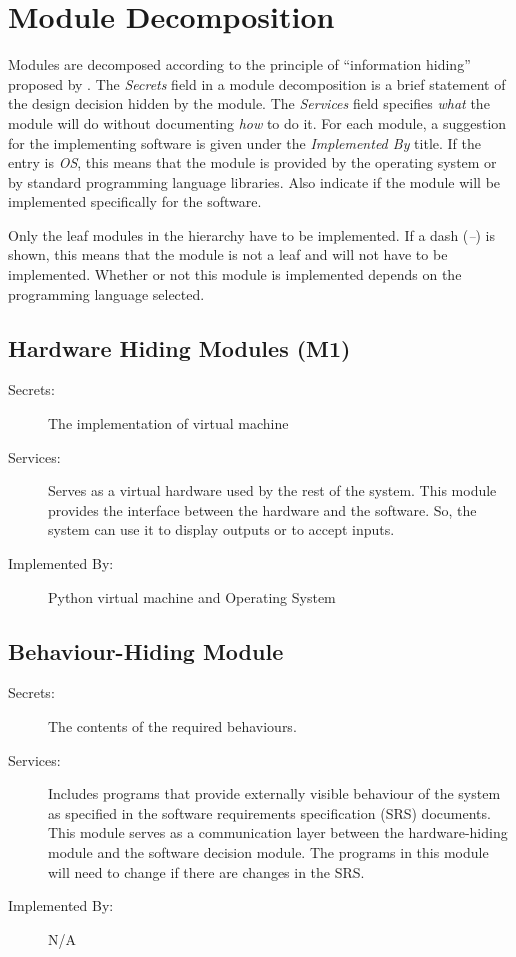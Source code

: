 \documentclass[12pt, titlepage]{article}
\begin{document}
\section{Module Decomposition} \label{SecMD}

Modules are decomposed according to the principle of ``information hiding''
proposed by \citet{ParnasEtAl1984}. The \emph{Secrets} field in a module
decomposition is a brief statement of the design decision hidden by the
module. The \emph{Services} field specifies \emph{what} the module will do
without documenting \emph{how} to do it. For each module, a suggestion for the
implementing software is given under the \emph{Implemented By} title. If the
entry is \emph{OS}, this means that the module is provided by the operating
system or by standard programming language libraries.  Also indicate if the
module will be implemented specifically for the software.

Only the leaf modules in the
hierarchy have to be implemented. If a dash (\emph{--}) is shown, this means
that the module is not a leaf and will not have to be implemented. Whether or
not this module is implemented depends on the programming language
selected.

\subsection{Hardware Hiding Modules (M1)}

\begin{description}
\item[Secrets:]The implementation of virtual machine
\item[Services:]Serves as a virtual hardware used by the rest of the
  system. This module provides the interface between the hardware and the
  software. So, the system can use it to display outputs or to accept inputs.
\item[Implemented By:] Python virtual machine and Operating System
\end{description}

\subsection{Behaviour-Hiding Module}

\begin{description}
\item[Secrets:]The contents of the required behaviours.
\item[Services:]Includes programs that provide externally visible behaviour of
  the system as specified in the software requirements specification (SRS)
  documents. This module serves as a communication layer between the
  hardware-hiding module and the software decision module. The programs in this
  module will need to change if there are changes in the SRS.
\item[Implemented By:] N/A
\end{description}
\end{document}
